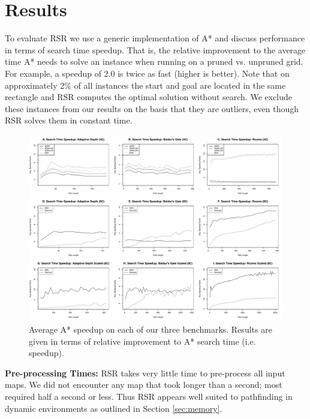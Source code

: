 \section{Results}
\label{sec-results}
To evaluate RSR we use a generic implementation of A* and discuss performance 
in terms of search time speedup. That is, the relative improvement to the average 
time A* needs to solve an instance when running on a pruned  vs. unpruned grid.
For example, a speedup of 2.0 is twice as fast (higher is better).
%
Note that on approximately 2\% of all instances the start and goal are located
in the same rectangle and RSR computes the optimal solution without
search.  We exclude these instances from our results on the basis that they are 
outliers, even though RSR solves them in constant time.

\par 
\begin{figure}[t]
       \begin{center}
				   \includegraphics[width=0.97\columnwidth, trim = 10mm 10mm 10mm 0mm]{diagrams/speedup.pdf}
       \end{center}
       \caption{Average A* speedup on each of our three benchmarks. 
		Results are given in terms of relative improvement to A* search time (i.e. speedup).}
\label{fig-speedup}
\end{figure}


\textbf{Pre-processing Times: } 
RSR takes very little time to pre-process all input maps. 
We did not encounter any map that took longer than a second; most required 
half a second or less.
Thus RSR appears well suited to
pathfinding in dynamic environments as outlined in Section \ref{sec:memory}.

